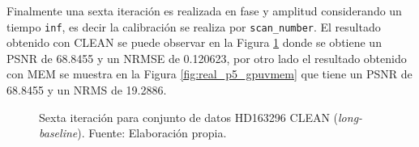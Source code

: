 Finalmente una sexta iteración es realizada en fase y amplitud considerando un tiempo \texttt{inf}, es decir la calibración se realiza por \texttt{scan\_number}. El resultado obtenido con CLEAN se puede observar en la Figura \ref{fig:real_p5_clean} donde se obtiene un PSNR de 68.8455 y un NRMSE de 0.120623, por otro lado el resultado obtenido con MEM se muestra en la Figura \ref{fig:real_p5_gpuvmem} que tiene un PSNR de 68.8455 y un NRMS de 19.2886.

\begin{figure}[!ht]
 \centering
    \vspace{0.3cm}
 \caption[Sexta iteración para conjunto de datos HD163296 CLEAN (\textit{long-baseline})]{Sexta iteración para conjunto de datos HD163296 CLEAN (\textit{long-baseline}). Fuente: Elaboración propia.}
 \label{fig:real_p5_clean}
\end{figure}


